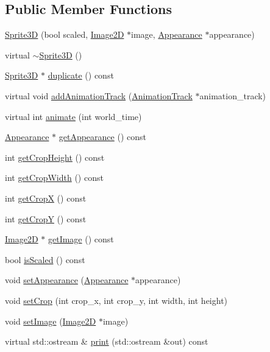 \subsection*{Public Member Functions}
\begin{CompactItemize}
\item 
\hyperlink{classm3g_1_1Sprite3D_9cb33fd453d441ed8e99b95f5e29df0c}{Sprite3D} (bool scaled, \hyperlink{classm3g_1_1Image2D}{Image2D} $\ast$image, \hyperlink{classm3g_1_1Appearance}{Appearance} $\ast$appearance)
\item 
virtual \hyperlink{classm3g_1_1Sprite3D_a57bd1e3141ba11c88ddec1e46c188d6}{$\sim$Sprite3D} ()
\item 
\hyperlink{classm3g_1_1Sprite3D}{Sprite3D} $\ast$ \hyperlink{classm3g_1_1Sprite3D_0af34e87be803eb476f9e118d2363246}{duplicate} () const 
\item 
virtual void \hyperlink{classm3g_1_1Sprite3D_415c0b110f95410ded9b85e5d99a496b}{addAnimationTrack} (\hyperlink{classm3g_1_1AnimationTrack}{AnimationTrack} $\ast$animation\_\-track)
\item 
virtual int \hyperlink{classm3g_1_1Sprite3D_8aad1ceab4c2a03609c8a42324ce484d}{animate} (int world\_\-time)
\item 
\hyperlink{classm3g_1_1Appearance}{Appearance} $\ast$ \hyperlink{classm3g_1_1Sprite3D_0219cb20ddea978a5796b5b414d012d2}{getAppearance} () const 
\item 
int \hyperlink{classm3g_1_1Sprite3D_d6d9d6f23b7bb004c93642bcd081f4a3}{getCropHeight} () const 
\item 
int \hyperlink{classm3g_1_1Sprite3D_5c6515f6706675ef31ca5dfa0a03b953}{getCropWidth} () const 
\item 
int \hyperlink{classm3g_1_1Sprite3D_d0ba0211183decc8f0459ca598b12912}{getCropX} () const 
\item 
int \hyperlink{classm3g_1_1Sprite3D_9ef03b219415a1f08aef6745ad5d87d0}{getCropY} () const 
\item 
\hyperlink{classm3g_1_1Image2D}{Image2D} $\ast$ \hyperlink{classm3g_1_1Sprite3D_a8c0193b0e7d47d4b5c9f60df24c44f5}{getImage} () const 
\item 
bool \hyperlink{classm3g_1_1Sprite3D_8e3e7fa70e1d3f2342580991105779f5}{isScaled} () const 
\item 
void \hyperlink{classm3g_1_1Sprite3D_b9b44bad4241635062ed66437c9bae48}{setAppearance} (\hyperlink{classm3g_1_1Appearance}{Appearance} $\ast$appearance)
\item 
void \hyperlink{classm3g_1_1Sprite3D_35ca6d3ff64f2232a0f3a11bf4ab483e}{setCrop} (int crop\_\-x, int crop\_\-y, int width, int height)
\item 
void \hyperlink{classm3g_1_1Sprite3D_705b89b41cd1b38f664ed912be44baaa}{setImage} (\hyperlink{classm3g_1_1Image2D}{Image2D} $\ast$image)
\item 
virtual std::ostream \& \hyperlink{classm3g_1_1Sprite3D_6fea17fa1532df3794f8cb39cb4f911f}{print} (std::ostream \&out) const 
\end{CompactItemize}
